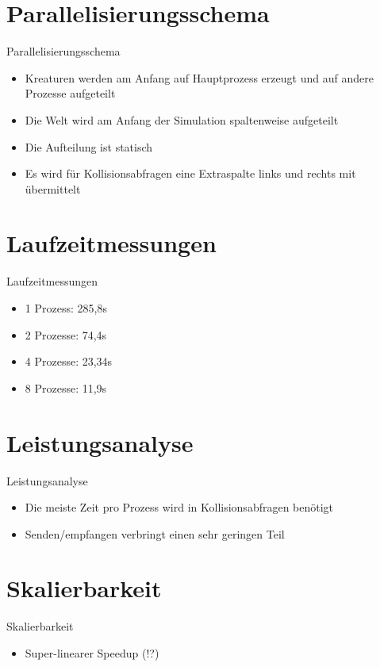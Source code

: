 \documentclass{beamer}
\begin{document}
\section{Parallelisierungsschema}
\begin{frame}{Parallelisierungsschema}
\begin{itemize}
	\item Kreaturen werden am Anfang auf Hauptprozess erzeugt und auf andere Prozesse aufgeteilt
    \item Die Welt wird am Anfang der Simulation spaltenweise aufgeteilt
    \item Die Aufteilung ist statisch
    \item Es wird für Kollisionsabfragen eine Extraspalte links und rechts mit übermittelt
\end{itemize}
\end{frame}


\section{Laufzeitmessungen}
\begin{frame}{Laufzeitmessungen}
\begin{itemize}
	\item 1 Prozess:  285,8s
	\item 2 Prozesse: 74,4s
	\item 4 Prozesse: 23,34s
	\item 8 Prozesse: 11,9s
\end{itemize}
\end{frame}


\section{Leistungsanalyse}
\begin{frame}{Leistungsanalyse}
\begin{itemize}
    \item Die meiste Zeit pro Prozess wird in Kollisionsabfragen benötigt
    \item Senden/empfangen verbringt einen sehr geringen Teil
\end{itemize}
\end{frame}


\section{Skalierbarkeit}
\begin{frame}{Skalierbarkeit}
\begin{itemize}
    \item Super-linearer Speedup (!?)
\end{itemize}
\end{frame}
\end{document}
